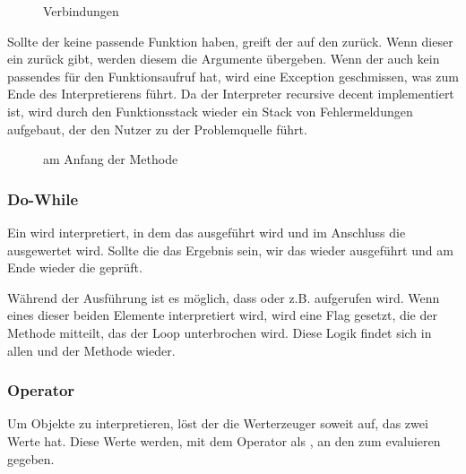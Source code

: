 {{      \begin{figure}[H]
        \centering
        \caption{ Verbindungen}
        \label{fig:intstack}
      \end{figure}


      Sollte der  keine passende Funktion haben, greift der  auf den  zurück. Wenn dieser ein  zurück gibt, werden diesem die Argumente übergeben. Wenn der  auch kein passendes  für den Funktionsaufruf hat, wird eine Exception geschmissen, was zum Ende des Interpretierens führt. Da der Interpreter recursive decent implementiert ist, wird durch den Funktionsstack wieder ein Stack von Fehlermeldungen aufgebaut, der den Nutzer zu der Problemquelle führt.
      \begin{figure}[H]
        \centering
        \caption{ am Anfang der  Methode}
        \label{fig:int8}
      \end{figure}

    \subsubsection{Do-While}
    \label{sssec:Do-While}
      Ein  wird interpretiert, in dem das  ausgeführt wird und im Anschluss die  ausgewertet wird. Sollte die das Ergebnis  sein, wir das  wieder ausgeführt und am Ende wieder die  geprüft.

      Während der Ausführung ist es möglich, dass  oder z.B.  aufgerufen wird. Wenn eines dieser beiden Elemente interpretiert wird, wird eine Flag gesetzt, die der  Methode mitteilt, das der Loop unterbrochen wird. Diese Logik findet sich in allen  und der  Methode wieder.

    \subsubsection{Operator}
    \label{sssec:Operator}
      Um  Objekte zu interpretieren, löst der  die Werterzeuger soweit auf, das zwei  Werte hat. Diese Werte werden, mit dem Operator als , an den  zum evaluieren gegeben.

}}
